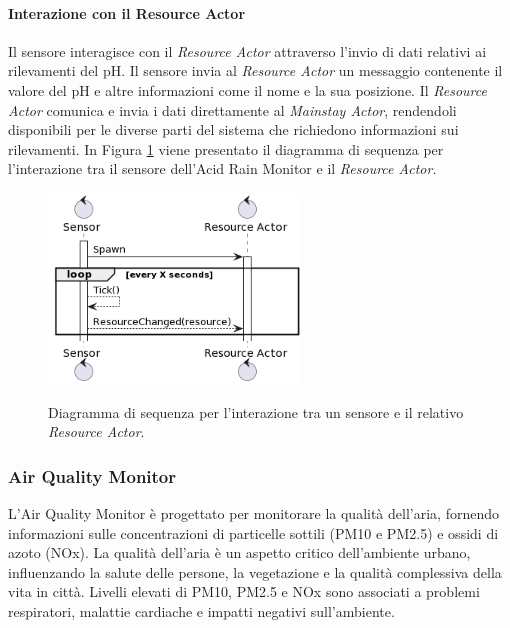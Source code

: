 \documentclass[12pt]{article}
\begin{document}
\paragraph{Interazione con il Resource Actor}
Il sensore interagisce con il \textit{Resource Actor} attraverso l'invio di dati relativi ai rilevamenti del pH. Il sensore invia al \textit{Resource Actor} un messaggio contenente il valore del pH e altre informazioni come il nome e la sua posizione. Il \textit{Resource Actor} comunica e invia i dati direttamente al \textit{Mainstay Actor}, rendendoli disponibili per le diverse parti del sistema che richiedono informazioni sui rilevamenti. In Figura \ref{fig:sensor-resourceactor-interaction-diagram} viene presentato il diagramma di sequenza per l'interazione tra il sensore dell'Acid Rain Monitor e il \textit{Resource Actor}.

\begin{figure}[H]
    \centering
    \caption{Diagramma di sequenza per l'interazione tra un sensore e il relativo \textit{Resource Actor}.}
    \includegraphics[width=0.6\textwidth]{../assets/images/sensor-resourceactor-interaction-diagram.png}
    \label{fig:sensor-resourceactor-interaction-diagram}
\end{figure}

\subsubsection{Air Quality Monitor}
L'Air Quality Monitor è progettato per monitorare la qualità dell'aria, fornendo informazioni sulle concentrazioni di particelle sottili (PM10 e PM2.5) e ossidi di azoto (NOx). La qualità dell'aria è un aspetto critico dell'ambiente urbano, influenzando la salute delle persone, la vegetazione e la qualità complessiva della vita in città. Livelli elevati di PM10, PM2.5 e NOx sono associati a problemi respiratori, malattie cardiache e impatti negativi sull'ambiente.
\end{document}

